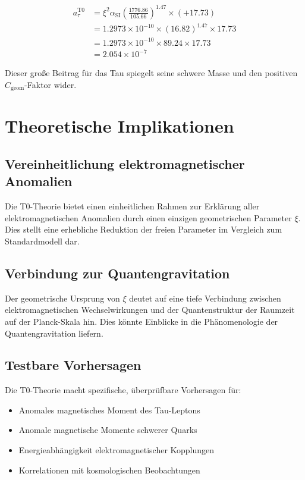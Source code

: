 \documentclass[12pt,a4paper]{article}
\newcommand{\xipar}{\xi}
\newcommand{\alphaSI}{\alpha_{\text{SI}}}
\newcommand{\Cgeom}{C_{\text{geom}}}
\begin{document}
	\begin{align}
		a_\tau^{\text{T0}} &= \xipar^2 \alphaSI \left(\frac{1776.86}{105.66}\right)^{1.47} \times (+17.73) \\
		&= 1.2973 \times 10^{-10} \times (16.82)^{1.47} \times 17.73 \\
		&= 1.2973 \times 10^{-10} \times 89.24 \times 17.73 \\
		&= 2.054 \times 10^{-7}
	\end{align}
	
	Dieser große Beitrag für das Tau spiegelt seine schwere Masse und den positiven $\Cgeom$-Faktor wider.
	
	\section{Theoretische Implikationen}
	
	\subsection{Vereinheitlichung elektromagnetischer Anomalien}
	
	Die T0-Theorie bietet einen einheitlichen Rahmen zur Erklärung aller elektromagnetischen Anomalien durch einen einzigen geometrischen Parameter $\xipar$. Dies stellt eine erhebliche Reduktion der freien Parameter im Vergleich zum Standardmodell dar.
	
	\subsection{Verbindung zur Quantengravitation}
	
	Der geometrische Ursprung von $\xipar$ deutet auf eine tiefe Verbindung zwischen elektromagnetischen Wechselwirkungen und der Quantenstruktur der Raumzeit auf der Planck-Skala hin. Dies könnte Einblicke in die Phänomenologie der Quantengravitation liefern.
	
	\subsection{Testbare Vorhersagen}
	
	Die T0-Theorie macht spezifische, überprüfbare Vorhersagen für:
	
	\begin{itemize}
		\item Anomales magnetisches Moment des Tau-Leptons
		\item Anomale magnetische Momente schwerer Quarks
		\item Energieabhängigkeit elektromagnetischer Kopplungen
		\item Korrelationen mit kosmologischen Beobachtungen
	\end{itemize}
	
\end{document}
